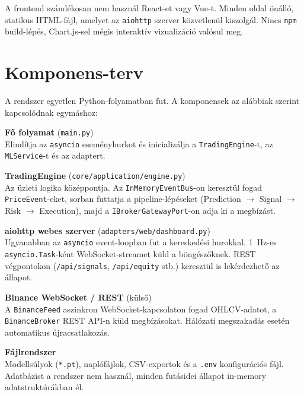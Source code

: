 A frontend szándékosan nem használ React-et vagy Vue-t.
Minden oldal önálló, statikus HTML-fájl, amelyet az \texttt{aiohttp}
szerver közvetlenül kiszolgál. Nincs \texttt{npm} build-lépés,
Chart.js-sel mégis interaktív vizualizáció valósul meg.

\section{Komponens-terv}
\label{sec:component_plan}

A rendszer egyetlen Python-folyamatban fut. A komponensek
az alábbiak szerint kapcsolódnak egymáshoz:

\noindent\textbf{Fő folyamat} (\texttt{main.py})\\
Elindítja az \texttt{asyncio} eseményhurkot és inicializálja
a \texttt{TradingEngine}-t, az \texttt{MLService}-t és az adaptert.

\noindent\textbf{TradingEngine} (\texttt{core/application/engine.py})\\
Az üzleti logika középpontja. Az \texttt{InMemoryEventBus}-on keresztül
fogad \texttt{PriceEvent}-eket, sorban futtatja a pipeline-lépéseket
(Prediction $\to$ Signal $\to$ Risk $\to$ Execution), majd a
\texttt{IBrokerGatewayPort}-on adja ki a megbízást.

\noindent\textbf{aiohttp webes szerver} (\texttt{adapters/web/dashboard.py})\\
Ugyanabban az \texttt{asyncio} event-loopban fut a kereskedési hurokkal.
1~Hz-es \texttt{asyncio.Task}-ként WebSocket-streamet küld a böngészőknek.
REST végpontokon (\texttt{/api/signals}, \texttt{/api/equity} stb.)
keresztül is lekérdezhető az állapot.

\noindent\textbf{Binance WebSocket / REST} (külső)\\
A \texttt{BinanceFeed} aszinkron WebSocket-kapcsolaton fogad
OHLCV-adatot, a \texttt{BinanceBroker} REST API-n küld megbízásokat.
Hálózati megszakadás esetén automatikus újracsatlakozás.

\noindent\textbf{Fájlrendszer}\\
Modellsúlyok (\texttt{*.pt}), naplófájlok, CSV-exportok és a
\texttt{.env} konfigurációs fájl. Adatbázist a rendszer nem használ,
minden futásidei állapot in-memory adatstruktúrákban él.

